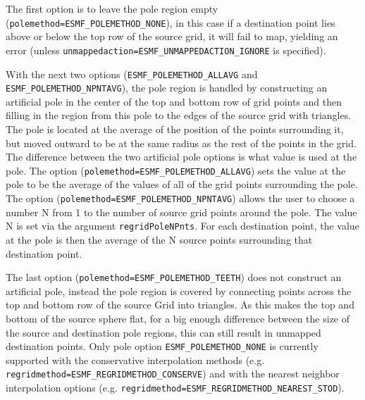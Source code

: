  The first option is to leave the pole region empty ({\tt polemethod=ESMF\_POLEMETHOD\_NONE}), in this 
 case if a destination point lies above or below the 
 top row of the source grid, it will fail to map, yielding an error (unless {\tt unmappedaction=ESMF\_UNMAPPEDACTION\_IGNORE} is specified).  

 With the next two options ({\tt ESMF\_POLEMETHOD\_ALLAVG} and {\tt ESMF\_POLEMETHOD\_NPNTAVG}), the pole region is handled by constructing 
 an artificial pole in the center of the top and bottom row of grid points and then filling
 in the region from this pole to the edges of the source grid with triangles. 
 The pole is located at the average of the position of the points surrounding
 it, but moved outward to be at the same radius as the rest of the points
 in the grid. The difference between the two artificial pole options is what value is used at the pole. 
 The option ({\tt polemethod=ESMF\_POLEMETHOD\_ALLAVG}) sets the value at the pole to be the average of the values
 of all of the grid points surrounding the pole. The option ({\tt polemethod=ESMF\_POLEMETHOD\_NPNTAVG}) allows the user to choose
 a number N from 1 to the number of source grid points around the pole. The value N is set via the argument {\tt regridPoleNPnts}. For
 each destination point, the value at the pole is then the average of the N source points
 surrounding that destination point. 

 The last option ({\tt polemethod=ESMF\_POLEMETHOD\_TEETH}) does not construct an artificial pole, instead the
 pole region is covered by connecting points across the top and bottom row of the source Grid into triangles. As 
 this makes the top and bottom of the source sphere flat, for a big enough difference between the size of
 the source and destination pole regions, this can still result in unmapped destination points.  
 Only pole option {\tt ESMF\_POLEMETHOD\_NONE} is currently supported with the conservative interpolation methods 
 (e.g. {\tt regridmethod=ESMF\_REGRIDMETHOD\_CONSERVE}) and with the nearest neighbor interpolation options (e.g. {\tt regridmethod=ESMF\_REGRIDMETHOD\_NEAREST\_STOD}).


